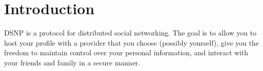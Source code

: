 \documentclass[letterpaper,11pt,oneside]{article}
\begin{document}
%
%


%
%
%


\section{Introduction}

%
%
%
%
% 


DSNP is a protocol for distributed social networking. The goal is to allow you
to host your profile with a provider that you choose (possibly yourself), give
you the freedom to maintain control over your personal information, and
interact with your friends and family in a secure manner.
\end{document}
